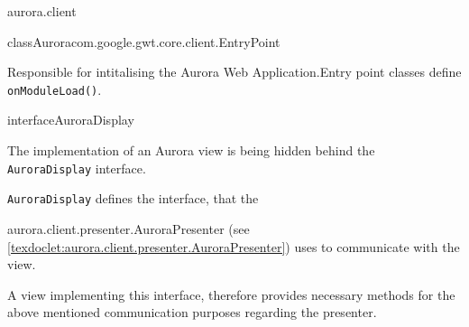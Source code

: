 \begin{texdocpackage}{aurora.client}
\label{texdoclet:aurora.client}

\begin{texdocclass}{class}{Aurora}{}{com.google.gwt.core.client.EntryPoint}
\label{texdoclet:aurora.client.Aurora}
\begin{texdocclassintro}
Responsible for intitalising the Aurora Web Application.\texdocbr  Entry point classes define \texttt{onModuleLoad()}.\end{texdocclassintro}
\begin{texdocclassconstructors}
\end{texdocclassconstructors}
\begin{texdocclassmethods}
\end{texdocclassmethods}
\end{texdocclass}


\begin{texdocclass}{interface}{AuroraDisplay}{}{}
\label{texdoclet:aurora.client.AuroraDisplay}
\begin{texdocclassintro}
\begin{texdocp}
     The implementation of an Aurora view is being hidden behind the \texttt{AuroraDisplay} interface.
 \end{texdocp}\texdocbr  \begin{texdocp}
     \texttt{AuroraDisplay} defines the interface, that the \end{texdocp}aurora.client.presenter.AuroraPresenter (see \ref{texdoclet:aurora.client.presenter.AuroraPresenter})
     uses to communicate with the view. \texdocbr{}

     A view implementing this interface, therefore provides necessary methods for the above mentioned
     communication purposes regarding the presenter.
 \end{texdocclassintro}
\begin{texdocclassmethods}
\end{texdocclassmethods}
\end{texdocclass}



\end{texdocpackage}
